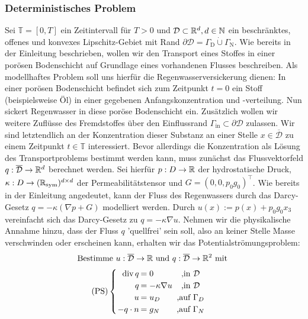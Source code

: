 \subsubsection{Deterministisches Problem}
\label{det_prob}
Sei $\mathbb{T} = [0,T]$ ein Zeitintervall für $T>0$ und $\mathcal{D} \subset \mathbb{R}^d , d \in \mathbb{N}$ ein beschränktes, offenes und konvexes Lipschitz-Gebiet mit Rand $ \partial \mathcal{D} = \Gamma_{\text{D}}  \dot{\cup} \Gamma_{\text{N}} $. 
Wie bereits in der Einleitung beschrieben, wollen wir den Transport eines Stoffes in einer porösen Bodenschicht auf Grundlage eines vorhandenen Flusses beschreiben. 
Als modellhaftes Problem soll uns hierfür die Regenwasserversickerung dienen: In einer porösen Bodenschicht befindet sich zum Zeitpunkt $t=0$ ein Stoff (beispielsweise Öl) in einer gegebenen Anfangskonzentration und -verteilung. Nun sickert Regenwasser in diese poröse Bodenschicht ein. Zusätzlich wollen wir weitere Zuflüsse des Fremdstoffes über den Einflussrand $\Gamma_{\text{in}} \subset \partial \mathcal{D}$ zulassen.
Wir sind letztendlich an der Konzentration dieser Substanz an einer Stelle $x \in \overline{\mathcal{D}}$ zu einem Zeitpunkt $t \in \mathbb{T}$ interessiert. \newline
Bevor allerdings die Konzentration als Lösung des Transportproblems bestimmt werden kann, muss zunächst das Flussvektorfeld $q: \overline{\mathcal{D}} \rightarrow \mathbb{R}^d$ berechnet werden. \newline
Sei hierfür $p: D \rightarrow \mathbb{R}$ der hydrostatische Druck, $\kappa: D \rightarrow (\mathbb{R}_{\text{sym}})^{d \times d}$ der Permeabilitätstensor und $G=(0,0,p_0 g_0)^{\top}$. 
Wie bereits in der Einleitung angedeutet, kann der Fluss des Regenwassers durch das Darcy-Gesetz $q=-\kappa(\nabla p + G)$ modelliert werden.
Durch $u(x) := p(x) + p_0 g_0 x_3$ vereinfacht sich das Darcy-Gesetz zu $q=-\kappa \nabla u$.\newline
Nehmen wir die physikalische Annahme hinzu, dass der Fluss $q$ 'quellfrei' sein soll, also an keiner Stelle Masse verschwinden oder erscheinen kann, erhalten wir das Potentialströmungsproblem:
\[ \text{Bestimme } u:\overline{\mathcal{D}} \to \R \text{ und } q: \overline{\mathcal{D}} \to \R^2 \text{ mit } \newline \]
\[\setlength\arraycolsep{1pt}
\text{(PS)}\begin{cases} 
\begin{array}{rlc}
\dive q     &= 0                 &\text{ ,} \text{in } \mathcal{D}\\
q           &= - \kappa \nabla u &\text{ ,} \text{in }\mathcal{D}\\
u           &= u_D               &\text{ ,} \text{auf } \Gamma_D \\
-q \cdot n  &= g_N               &\text{ ,} \text{auf } \Gamma_N 
\end{array}
\end{cases} \\
\]
